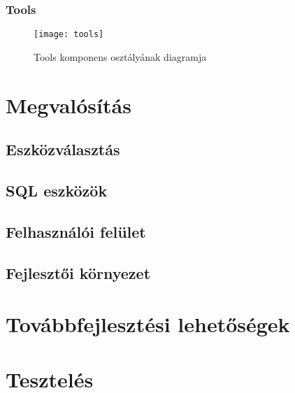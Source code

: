 \subsubsection{Tools}

\begin{figure}[ht]
  \begin{center}
  \texttt{[image: tools]}
  \end{center}
 \caption{Tools komponens osztályának diagramja}
\end{figure}



\section{Megvalósítás}
\subsection{Eszközválasztás}
\subsection{SQL eszközök}
\subsection{Felhasználói felület}
\subsection{Fejlesztői környezet}

\section{Továbbfejlesztési lehetőségek}

\section{Tesztelés}